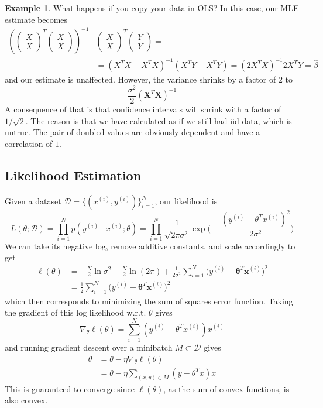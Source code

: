 \documentclass{article}
\theoremstyle{definition}
\newtheorem{example}{Example}[section]
\begin{document}
  \begin{example}
  What happens if you copy your data in OLS? In this case, our MLE estimate becomes 
  \begin{align*}
      \left(\begin{pmatrix}X \\ X \end{pmatrix}^T \begin{pmatrix} X \\ X \end{pmatrix} \right )^{-1} & \begin{pmatrix} X \\ X  \end{pmatrix}^T \begin{pmatrix} Y \\ Y  \end{pmatrix}  =\\
  & = (X^T X + X^T X)^{-1} (X^T Y + X^T Y ) = (2 X^T X)^{-1} 2 X^T Y = \hat{\beta}
  \end{align*}
  and our estimate is unaffected. However, the variance shrinks by a factor of $2$ to 
  \[\frac{\sigma^2}{2} (\mathbf{X}^T \mathbf{X})^{-1}\]
  A consequence of that is that confidence intervals will shrink with a factor of $1/\sqrt{2}$. The reason is that we have calculated as if we still had iid data, which is untrue. The pair of doubled values are obviously dependent and have a correlation of $1$. 
  \end{example}

  \subsection{Likelihood Estimation}

  Given a dataset $\mathcal{D} = \{(x^{(i)}, y^{(i)})\}_{i=1}^N$, our likelihood is 
  \[L(\theta ; \mathcal{D}) = \prod_{i=1}^N p(y^{(i)} \mid x^{(i)}; \theta) = \prod_{i=1}^N \frac{1}{\sqrt{2 \pi \sigma^2}} \exp \bigg( -\frac{(y^{(i)} - \theta^T x^{(i)})^2}{2 \sigma^2} \bigg)\]
  We can take its negative log, remove additive constants, and scale accordingly to get 
  \begin{align*}
      \ell (\theta) & = -\frac{N}{2} \ln{\sigma^2} - \frac{N}{2} \ln(2 \pi) + \frac{1}{2 \sigma^2} \sum_{i=1}^N \big(y^{(i)} - \boldsymbol{\theta}^T \mathbf{x}^{(i)} \big)^2 \\
      & =\frac{1}{2} \sum_{i=1}^N \big(y^{(i)} - \boldsymbol{\theta}^T \mathbf{x}^{(i)} \big)^2 
  \end{align*}
  which then corresponds to minimizing the sum of squares error function. Taking the gradient of this log likelihood w.r.t. $\theta$ gives 
  \[\nabla_\theta \ell (\theta) = \sum_{i=1}^N ( y^{(i)} - \theta^T x^{(i)}) x^{(i)} \]
  and running gradient descent over a minibatch $M \subset \mathcal{D}$ gives 
  \begin{align*}
      \theta & = \theta - \eta \nabla_\theta \ell (\theta) \\
      & = \theta - \eta \sum_{(x, y) \in M} (y - \theta^T x) x
  \end{align*}
  This is guaranteed to converge since $\ell(\theta)$, as the sum of convex functions, is also convex. 
\end{document}
